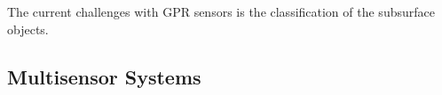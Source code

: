 \documentclass[main.tex]{subfiles}
\begin{document}



The current challenges with GPR sensors is the classification of the subsurface objects. %



\subsection{Multisensor Systems}
\end{document}
